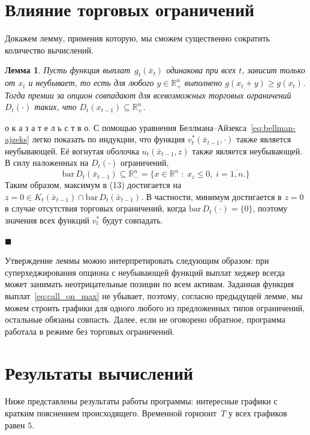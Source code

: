 \documentclass[a4paper, 12pt]{article}
\theoremstyle{def}
\theoremstyle{th}
\newtheorem{lemma}{Лемма}
\theoremstyle{rem}
\renewenvironment{proof}{\parД о к а з а т е л ь с т в о.}{\hfill$\blacksquare$}
\begin{document}
    
    \section{Влияние торговых ограничений}

    Докажем лемму, применив которую, мы сможем существенно сократить количество вычислений.

    \begin{lemma}
        Пусть функция выплат~$g_t(\bar x_t)$ одинакова при всех $t$, зависит только от $x_t$ и неубывает, то есть для любого $y\in\mathbb{R}^n_{+}$ выполнено $g(x_t + y) \geqslant g(x_t)$.
        Тогда премии за опцион совпадают для всевозможных торговых ограничений $D_t(\cdot)$ таких, что $D_t(x_{t-1}) \subseteq \mathbb{R}^n_{+}$.
    \end{lemma}

    \begin{proof}
        С помощью уравнения Беллмана–Айзекса~\eqref{eq:bellman-ajzeks} легко показать по индукции, что функция $v_t^*(\bar x_{t-1}, \cdot)$ также является неубывающей. Её вогнутая оболочка $u_t(\bar x_{t-1}, z)$ также является неубывающей. В силу наложенных на $D_t(\cdot)$ ограничений,
        \begin{equation}
            \mathrm{bar}\,D_t(\bar x_{t-1}) \subseteq \mathbb{R}^n_{-} = \{x \in \mathbb{R}^n\;:\;x_i \leqslant 0,\; i=\overline{1,n}.\}
        \end{equation}
        Таким образом, максимум в (13) достигается на $z = 0 \in K_t(\bar x_{t-1}) \cap \mathrm{bar}\,D_t(\bar x_{t-1})$. В частности, минимум достигается в $z = 0$ в случае отсутствия торговых ограничений, когда $\mathrm{bar}\,D_t(\cdot) = \{0\}$, поэтому значения всех функций $v_t^*$ будут совпадать.

    \end{proof}

    Утверждение леммы можно интерпретировать следующим образом: при суперхеджирования опциона с неубывающей функций выплат хеджер всегда может занимать неотрицательные позиции по всем активам.
    Заданная функция выплат~\eqref{eq:call_on_max} не убывает, поэтому, согласно предыдущей лемме, мы можем строить графики для одного любого из предложенных типов ограничений, остальные обязаны совпасть.
    Далее, если не оговорено обратное, программа работала в режиме без торговых ограничений.
    
    
    \section{Результаты вычислений}
    Ниже представлены результаты работы программы: интересные графики с кратким пояснением происходящего.
    Временной горизонт~$T$ у всех графиков равен $5$.
\end{document}

